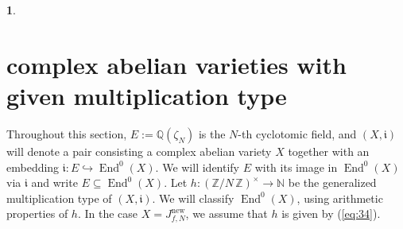 \documentclass{amsart}[11pt]
\theoremstyle{definition}
\newtheorem{sect}[thm]{}
\numberwithin{equation}{section}
\theoremstyle{notitle}
\begin{document}
\begin{sect}
  
  
  
  
  
  
  
  
  
  
  
  
  
  
  
  
  
  
  
  

\end{sect}
\section{complex abelian varieties with given multiplication type}
\label{sec:compl-abel-vari}
Throughout this section, $E:={\mathbb{Q}}(\zeta_N)$ is the $N$-th cyclotomic
field, and $(X, {\mathfrak{i}})$ will denote a pair consisting a complex abelian
variety $X$ together with an embedding ${\mathfrak{i}}:
E\hookrightarrow \operatorname{End}^0(X)$. We will identify $E$ with its image in
$\operatorname{End}^0(X)$ via ${\mathfrak{i}}$ and write $E\subseteq \operatorname{End}^0(X)$.  Let $h:
{(\mathbb{Z}/ {N}\, \mathbb{Z})^\times}\to {\mathbb{N}}$ be the generalized multiplication type of $(X, {\mathfrak{i}})$.
We will classify $\operatorname{End}^0(X)$, using arithmetic properties of $h$. In
the case $X=J_{f,N}^{\mathrm{new}}$, we assume that $h$ is given by
(\ref{eq:34}).
\end{document}
